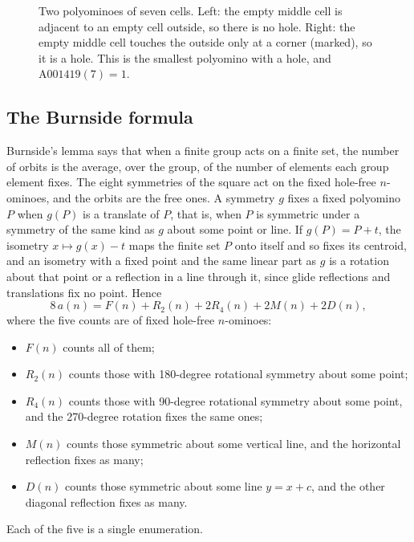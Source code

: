 \documentclass[11pt]{a000104}
\numberwithin{equation}{section}
\begin{document}
\begin{figure}[!htbp]
  \centering
  \caption{Two polyominoes of seven cells. Left: the empty middle cell is adjacent to an empty cell outside, so there is no hole. Right: the empty middle cell touches the outside only at a corner (marked), so it is a hole. This is the smallest polyomino with a hole, and $\text{A001419}(7) = 1$.}
  \label{fig:heptominoes}
\end{figure}

\subsection{The Burnside formula}

Burnside's lemma says that when a finite group acts on a finite set, the number of orbits is the average, over the group, of the number of elements each group element fixes.
The eight symmetries of the square act on the fixed hole-free $n$-ominoes, and the orbits are the free ones.
A symmetry $g$ fixes a fixed polyomino $P$ when $g(P)$ is a translate of $P$, that is, when $P$ is symmetric under a symmetry of the same kind as $g$ about some point or line.
If $g(P) = P + t$, the isometry $x \mapsto g(x) - t$ maps the finite set $P$ onto itself and so fixes its centroid, and an isometry with a fixed point and the same linear part as $g$ is a rotation about that point or a reflection in a line through it, since glide reflections and translations fix no point.
Hence
\begin{equation}\label{eq:burnside}
  8\,a(n) = F(n) + R_2(n) + 2R_4(n) + 2M(n) + 2D(n),
\end{equation}
where the five counts are of fixed hole-free $n$-ominoes:
\begin{itemize}
  \item $F(n)$ counts all of them;
  \item $R_2(n)$ counts those with 180-degree rotational symmetry about some point;
  \item $R_4(n)$ counts those with 90-degree rotational symmetry about some point, and the 270-degree rotation fixes the same ones;
  \item $M(n)$ counts those symmetric about some vertical line, and the horizontal reflection fixes as many;
  \item $D(n)$ counts those symmetric about some line $y = x + c$, and the other diagonal reflection fixes as many.
\end{itemize}
Each of the five is a single enumeration.
\end{document}
